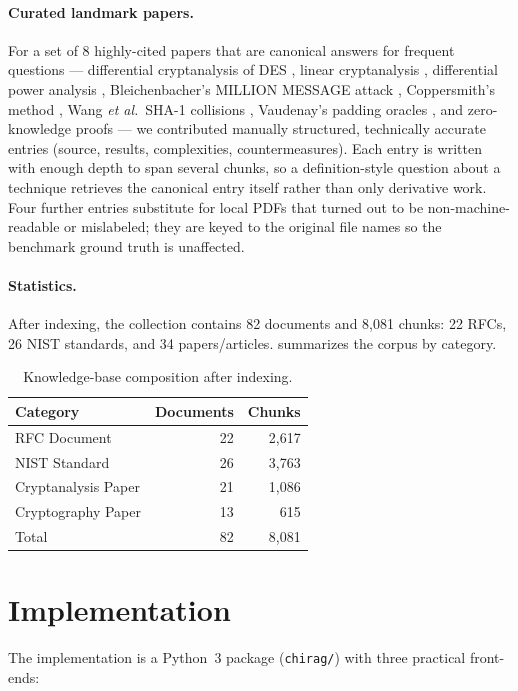 \documentclass[version=submission]{iacrcc}
\begin{document}
\paragraph{Curated landmark papers.}
For a set of 8 highly-cited papers that are canonical answers for frequent
questions --- differential cryptanalysis of DES \cite{BS91}, linear
cryptanalysis \cite{Mat93}, differential power analysis \cite{KJJ99},
Bleichenbacher's MILLION MESSAGE attack \cite{Ble98}, Coppersmith's method
\cite{Cop97}, Wang \emph{et al.}\ SHA-1 collisions \cite{WYY05}, Vaudenay's
padding oracles \cite{Vau02}, and zero-knowledge proofs \cite{GMR89} --- we
contributed manually structured, technically accurate entries (source,
results, complexities, countermeasures). Each entry is written with enough
depth to span several chunks, so a definition-style question about a
technique retrieves the canonical entry itself rather than only derivative
work. Four further entries substitute for local PDFs that turned out to be
non-machine-readable or mislabeled; they are keyed to the original file
names so the benchmark ground truth is unaffected.

\paragraph{Statistics.}
After indexing, the collection contains 82 documents and 8{,}081 chunks:
22 RFCs, 26 NIST standards, and 34 papers/articles. 
summarizes the corpus by category.

\begin{table}[t]
\centering
\caption{Knowledge-base composition after indexing.}
\label{tab:kb}
\begin{tabular}{lrr}
\toprule
Category & Documents & Chunks\\
\midrule
RFC Document & 22 & 2{,}617\\
NIST Standard & 26 & 3{,}763\\
Cryptanalysis Paper & 21 & 1{,}086\\
Cryptography Paper & 13 & 615\\
\midrule
Total & 82 & 8{,}081\\
\bottomrule
\end{tabular}
\end{table}

\section{Implementation}

The implementation is a Python~3 package (\texttt{chirag/}) with three
practical front-ends:
\end{document}
